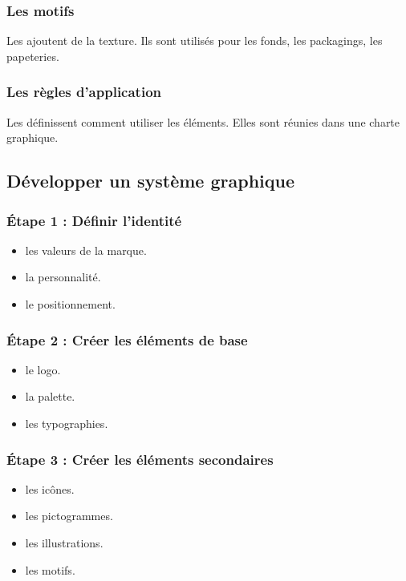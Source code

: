 \subsubsection{Les motifs}

Les  ajoutent de la texture. Ils sont utilisés pour les fonds, les packagings, les papeteries.

\subsubsection{Les règles d'application}

Les  définissent comment utiliser les éléments. Elles sont réunies dans une charte graphique.

\subsection{Développer un système graphique}

\subsubsection{Étape 1 : Définir l'identité}

\begin{itemize}
    \item {} les valeurs de la marque.
    \item {} la personnalité.
    \item {} le positionnement.
\end{itemize}

\subsubsection{Étape 2 : Créer les éléments de base}

\begin{itemize}
    \item {} le logo.
    \item {} la palette.
    \item {} les typographies.
\end{itemize}

\subsubsection{Étape 3 : Créer les éléments secondaires}

\begin{itemize}
    \item {} les icônes.
    \item {} les pictogrammes.
    \item {} les illustrations.
    \item {} les motifs.
\end{itemize}

